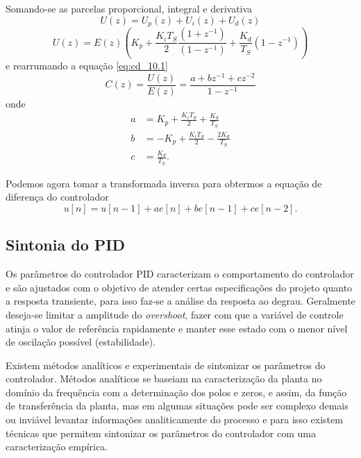 Somando-se as parcelas proporcional, integral e derivativa
\begin{equation}
    \label{eq:cd_10}
    U(z) = U_p(z) + U_i(z) + U_d(z)
\end{equation}
\begin{equation}
    \label{eq:cd_10.1}
    U(z) = E(z)\left(K_p+\frac{K_iT_S}{2} \frac{(1+z^{-1})}{(1-z^{-1})} + \frac{K_d}{T_S}(1-z^{-1})\right)
\end{equation}
e rearrumando a equação \eqref{eq:cd_10.1}
\begin{equation}
    \label{eq:cd_11}
    C(z) = \frac{U(z)}{E(z)} = \frac{a+bz^{-1}+cz^{-2}}{1-z^{-1}}
\end{equation}
onde
\begin{align}
  a &= K_p + \frac{K_iT_S}{2} + \frac{K_d}{T_S} \nonumber\\
  b &= -K_p + \frac{K_iT_S}{2} - \frac{2K_d}{T_S} \nonumber\\
  c &= \frac{K_d}{T_S}. \nonumber
\end{align}

Podemos agora tomar a transformada inversa para obtermos a equação de diferença do controlador
\begin{equation}
    \label{eq:cd_12}
    u[n] = u[n-1] + ae[n] + be[n-1]+ce[n-2].
\end{equation}

\subsection{Sintonia do PID}

Os parâmetros do controlador PID caracterizam o comportamento do controlador e são ajustados com o objetivo de atender certas especificações do projeto quanto a resposta transiente, para isso faz-se a análise da resposta ao degrau. Geralmente deseja-se limitar a amplitude do \textit{overshoot}, fazer com que a variável de controle atinja o valor de referência rapidamente e manter esse estado com o menor nível de oscilação possível (estabilidade). 

Existem métodos analíticos e experimentais de sintonizar os parâmetros do controlador. Métodos analíticos se baseiam na caracterização da planta no domínio da frequência com a determinação dos polos e zeros, e assim, da função de transferência da planta, mas em algumas situações pode ser complexo demais ou inviável levantar informações analiticamente do processo e para isso existem técnicas que permitem sintonizar os parâmetros do controlador com uma caracterização empírica.

